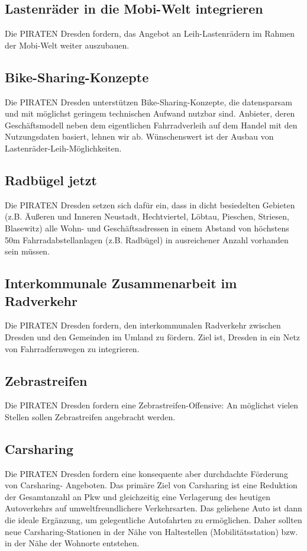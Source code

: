 \documentclass[a4paper, 11pt]{article}
\begin{document}
\subsection{Lastenräder in die Mobi-Welt integrieren}
Die PIRATEN Dresden fordern, das Angebot an Leih-Lastenrädern im Rahmen der Mobi-Welt weiter auszubauen.


\subsection{Bike-Sharing-Konzepte}
Die PIRATEN Dresden unterstützen Bike-Sharing-Konzepte, die datensparsam und mit möglichst geringem technischen Aufwand nutzbar sind. Anbieter, deren Geschäftsmodell neben dem eigentlichen Fahrradverleih auf dem Handel mit den Nutzungsdaten basiert, lehnen wir ab. Wünschenswert ist der Ausbau von Lastenräder-Leih-Möglichkeiten.



\subsection{Radbügel jetzt}
Die PIRATEN Dresden setzen sich dafür ein, dass in dicht besiedelten Gebieten (z.B. Äußeren und Inneren Neustadt, Hechtviertel, Löbtau, Pieschen, Striesen, Blasewitz) alle Wohn- und Geschäftsadressen in einem Abstand von höchstens 50m Fahrradabstellanlagen (z.B. Radbügel) in ausreichener Anzahl vorhanden sein müssen.


\subsection{Interkommunale Zusammenarbeit im Radverkehr}
Die PIRATEN Dresden fordern, den interkommunalen Radverkehr zwischen Dresden und den Gemeinden im Umland zu fördern. Ziel ist, Dresden in ein Netz von Fahrradfernwegen zu integrieren.


\subsection{Zebrastreifen}
Die PIRATEN Dresden fordern eine Zebrastreifen-Offensive: An möglichst vielen Stellen sollen Zebrastreifen angebracht werden.


\subsection{Carsharing}
Die PIRATEN Dresden fordern eine konsequente aber durchdachte Förderung von Carsharing- Angeboten. Das primäre Ziel von Carsharing ist eine Reduktion der Gesamtanzahl an Pkw und gleichzeitig eine Verlagerung des heutigen Autoverkehrs auf umweltfreundlichere Verkehrsarten. Das geliehene Auto ist dann die ideale Ergänzung, um gelegentliche Autofahrten zu ermöglichen. Daher sollten neue Carsharing-Stationen in der Nähe von Haltestellen (Mobilitätsstation) bzw. in der Nähe der Wohnorte entstehen.\newline
\end{document}
